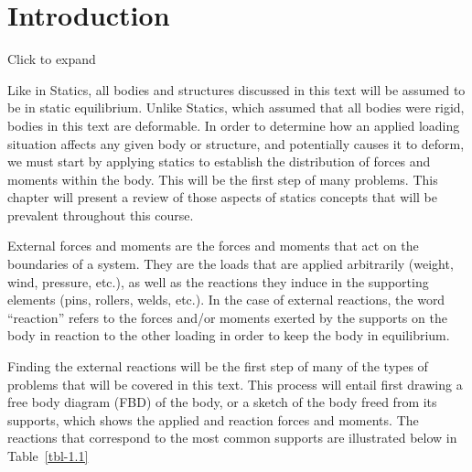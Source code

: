 \documentclass[
  letterpaper,
  DIV=11,
  numbers=noendperiod]{scrreprt}
\theoremstyle{definition}
\theoremstyle{remark}
\begin{document}
\section*{Introduction}\label{introduction}


Click to expand

Like in Statics, all bodies and structures discussed in this text will
be assumed to be in static equilibrium. Unlike Statics, which assumed
that all bodies were rigid, bodies in this text are deformable. In order
to determine how an applied loading situation affects any given body or
structure, and potentially causes it to deform, we must start by
applying statics to establish the distribution of forces and moments
within the body. This will be the first step of many problems. This
chapter will present a review of those aspects of statics concepts that
will be prevalent throughout this course.

External forces and moments are the forces and moments that act on the
boundaries of a system. They are the loads that are applied arbitrarily
(weight, wind, pressure, etc.), as well as the reactions they induce in
the supporting elements (pins, rollers, welds, etc.). In the case of
external reactions, the word ``reaction'' refers to the forces and/or
moments exerted by the supports on the body in reaction to the other
loading in order to keep the body in equilibrium.

Finding the external reactions will be the first step of many of the
types of problems that will be covered in this text. This process will
entail first drawing a free body diagram (FBD) of the body, or a sketch
of the body freed from its supports, which shows the applied and
reaction forces and moments. The reactions that correspond to the most
common supports are illustrated below in Table~\ref{tbl-1.1}
\end{document}
